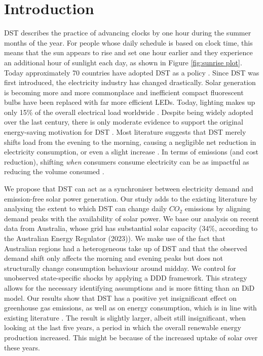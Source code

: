 
\section{Introduction}
\ac{DST} describes the practice of advancing clocks by one hour during the summer months of the year. For people whose daily schedule is based on clock time, this means that the sun appears to rise and set one hour earlier and they experience an additional hour of sunlight each day, as shown in Figure \ref{fig:sunrise plot}. Today approximately 70 countries have adopted \ac{DST} as a policy \parencite{prerau_book}. Since \ac{DST} was first introduced, the electricity industry has changed drastically. Solar generation is becoming more and more commonplace and inefficient compact fluorescent bulbs have been replaced with far more efficient LEDs. Today, lighting makes up only 15\% of the overall electrical load worldwide \parencite{ec_lighting}. 
Despite being widely adopted over the last century, there is only moderate evidence to support the original energy-saving motivation for \ac{DST} \parencite{prerau_book}. Most literature suggests that \ac{DST} merely shifts load from the evening to the morning, causing a negligible net reduction in electricity consumption, or even a slight increase \parencite{kellogg_daylight_2008, aries_effect_2008, guven}.
In terms of emissions (and cost reduction), shifting \textit{when} consumers consume electricity can be as impactful as reducing the volume consumed \parencite{holland_is_2008}.

We propose that \ac{DST} can act as a synchroniser between electricity demand and emission-free solar power generation. Our study adds to the existing literature by analysing the extent to which DST can change daily $CO_2$ emissions by aligning demand peaks with the availability of solar power. We base our analysis on recent data from Australia, whose grid has substantial solar capacity (34\%, according to the Australian Energy Regulator (2023)\nocite{state_of_the_market}). We make use of the fact that Australian regions had a heterogeneous take up of \ac{DST} and that the observed demand shift only affects the morning and evening peaks but does not structurally change consumption behaviour around midday. We control for unobserved state-specific shocks by applying a \ac{DDD} framework. This strategy allows for the necessary identifying assumptions and is more fitting than an \ac{DiD} model. Our results show that \ac{DST} has a positive yet insignificant effect on greenhouse gas emissions, as well as on energy consumption, which is in line with existing literature \parencite{kellogg_daylight_2008}. The result is slightly larger, albeit still insignificant, when looking at the last five years, a period in which the overall renewable energy production increased. This might be because of the increased uptake of solar over these years.